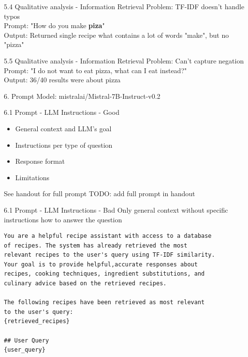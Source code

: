 \documentclass{beamer}
\begin{document}
\begin{frame} {5.4 Qualitative analysis - Information Retrieval}
  Problem: TF-IDF doesn't handle typos\\
  Prompt: "How do you make \textbf{piza}"\\
  Output: Returned single recipe what contains a lot of words "make", but no "pizza"
\end{frame}

\begin{frame} {5.5 Qualitative analysis - Information Retrieval}
  Problem: Can't capture negation\\
  Prompt:  "I do not want to eat pizza, what can I eat instead?"\\
  Output: 36/40 results were about pizza %
\end{frame}

\begin{frame}{6. Prompt}
  Model: mistralai/Mistral-7B-Instruct-v0.2
\end{frame}

\begin{frame}[fragile]{6.1 Prompt - LLM Instructions - Good}
  \begin{itemize}
    \item General context and LLM's goal
    \item Instructions per type of question
    \item Response format
    \item Limitations
  \end{itemize}

  See handout for full prompt
  TODO: add full prompt in handout
\end{frame}

\begin{frame}[fragile]{6.1 Prompt - LLM Instructions - Bad}
  Only general context without specific instructions how to answer the question
  \begin{verbatim}
You are a helpful recipe assistant with access to a database
of recipes. The system has already retrieved the most
relevant recipes to the user's query using TF-IDF similarity.
Your goal is to provide helpful,accurate responses about
recipes, cooking techniques, ingredient substitutions, and
culinary advice based on the retrieved recipes.

The following recipes have been retrieved as most relevant
to the user's query:
{retrieved_recipes}

## User Query
{user_query}
\end{verbatim}
\end{frame}
\end{document}

